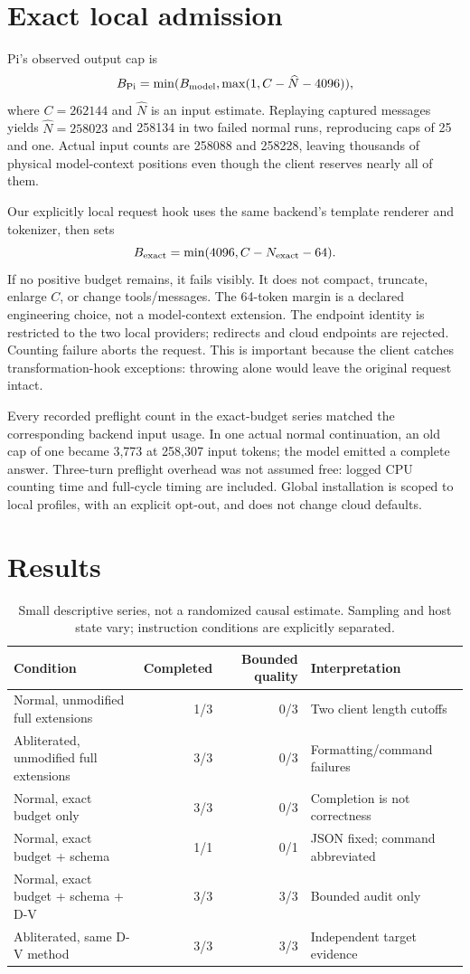 \documentclass[11pt]{article}
\begin{document}
\section{Exact local admission}
Pi's observed output cap is
\[
B_{\rm Pi}=\min(B_{\rm model},\max(1,C-\widehat N-4096)),
\]
where $C=262144$ and $\widehat N$ is an input estimate. Replaying captured messages yields $\widehat N=258023$ and 258134 in two failed normal runs, reproducing caps of 25 and one. Actual input counts are 258088 and 258228, leaving thousands of physical model-context positions even though the client reserves nearly all of them.

Our explicitly local request hook uses the same backend's template renderer and tokenizer, then sets
\[
B_{\rm exact}=\min(4096,C-N_{\rm exact}-64).
\]
If no positive budget remains, it fails visibly. It does not compact, truncate, enlarge $C$, or change tools/messages. The 64-token margin is a declared engineering choice, not a model-context extension. The endpoint identity is restricted to the two local providers; redirects and cloud endpoints are rejected. Counting failure aborts the request. This is important because the client catches transformation-hook exceptions: throwing alone would leave the original request intact.

Every recorded preflight count in the exact-budget series matched the corresponding backend input usage. In one actual normal continuation, an old cap of one became 3,773 at 258,307 input tokens; the model emitted a complete answer. Three-turn preflight overhead was not assumed free: logged CPU counting time and full-cycle timing are included. Global installation is scoped to local profiles, with an explicit opt-out, and does not change cloud defaults.

\section{Results}
\begin{table}[H]\centering\small
\setlength{\tabcolsep}{4pt}
\begin{tabular}{lrrl}\toprule
Condition & Completed & Bounded quality & Interpretation\\\midrule
Normal, unmodified full extensions & 1/3 & 0/3 & Two client length cutoffs\\
Abliterated, unmodified full extensions & 3/3 & 0/3 & Formatting/command failures\\
Normal, exact budget only & 3/3 & 0/3 & Completion is not correctness\\
Normal, exact budget + schema & 1/1 & 0/1 & JSON fixed; command abbreviated\\
Normal, exact budget + schema + D-V & 3/3 & 3/3 & Bounded audit only\\
Abliterated, same D-V method & 3/3 & 3/3 & Independent target evidence\\\bottomrule
\end{tabular}
\caption{Small descriptive series, not a randomized causal estimate. Sampling and host state vary; instruction conditions are explicitly separated.}
\end{table}
\end{document}
